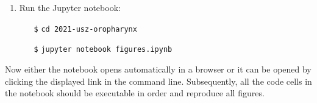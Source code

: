 \begin{tcolorbox}[title=\faIcon{recycle} Reproducibility, parbox=false]
\begin{enumerate}
        \item Run the Jupyter notebook:
        \begin{itemize}[leftmargin=10mm]
            \setlength\itemsep{-0.5em}
            \item[\texttt{\$}] \verb|cd 2021-usz-oropharynx|
            \item[\texttt{\$}] \verb|jupyter notebook figures.ipynb|
        \end{itemize}
    \end{enumerate}

    Now either the notebook opens automatically in a browser or it can be opened by clicking the displayed link in the command line. Subsequently, all the code cells in the notebook should be executable in order and reproduce all figures.
\end{tcolorbox}
